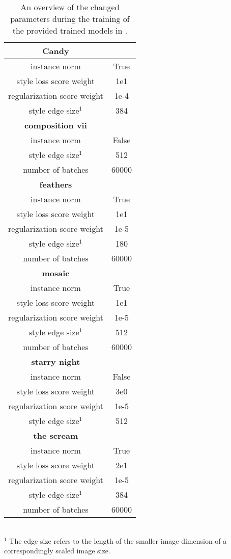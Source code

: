 \begin{table*}[!t]
	\renewcommand{\arraystretch}{1.3}
	\caption{An overview of the changed parameters during the training of the provided trained models in \cite{JAL2016}.}
	\label{tab:johnson_adapted_hyperparams}
	\centering
	\begin{tabular}{c|c}
		\hline
		\bfseries Candy &  \\
		\hline\hline
		instance norm & True \\
		style loss score weight & 1e1 \\
		regularization score weight & 1e-4\\
		style edge size$^1$ & 384\\
		\hline
		\bfseries composition vii & \\
		\hline
		instance norm & False \\
		style edge size$^1$ & 512\\
		number of batches & 60000\\
		\hline
		\bfseries feathers & \\
		\hline
		instance norm & True \\
		style loss score weight & 1e1 \\
		regularization score weight & 1e-5\\
		style edge size$^1$ & 180\\
		number of batches & 60000\\
		\hline
		\bfseries mosaic & \\
		\hline
		instance norm & True \\
		style loss score weight & 1e1 \\
		regularization score weight & 1e-5\\
		style edge size$^1$ & 512\\
		number of batches & 60000\\
		\hline
		\bfseries starry night & \\
		\hline
		instance norm & False \\
		style loss score weight & 3e0 \\
		regularization score weight & 1e-5\\
		style edge size$^1$ & 512\\
		\hline
		\bfseries the scream & \\
		\hline
		instance norm & True \\
		style loss score weight & 2e1 \\
		regularization score weight & 1e-5\\
		style edge size$^1$ & 384\\
		number of batches & 60000\\
		\hline
	\end{tabular}
	\footnotesize{
		\\$^1$ The edge size refers to the length of the smaller image dimension of a correspondingly scaled image size.}
\end{table*}

